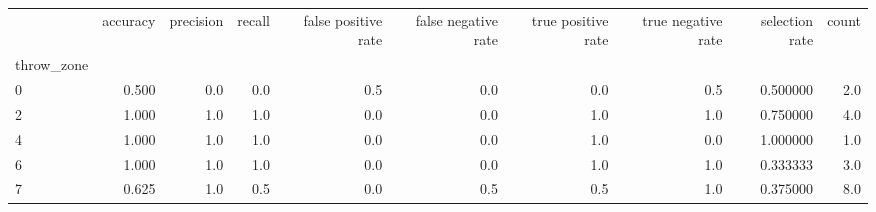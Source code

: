 \begin{tabular}{lrrrrrrrrr}
\toprule
{} &  accuracy &  precision &  recall &  false positive rate &  false negative rate &  true positive rate &  true negative rate &  selection rate &  count \\
throw\_zone &           &            &         &                      &                      &                     &                     &                 &        \\
\midrule
0          &     0.500 &        0.0 &     0.0 &                  0.5 &                  0.0 &                 0.0 &                 0.5 &        0.500000 &    2.0 \\
2          &     1.000 &        1.0 &     1.0 &                  0.0 &                  0.0 &                 1.0 &                 1.0 &        0.750000 &    4.0 \\
4          &     1.000 &        1.0 &     1.0 &                  0.0 &                  0.0 &                 1.0 &                 0.0 &        1.000000 &    1.0 \\
6          &     1.000 &        1.0 &     1.0 &                  0.0 &                  0.0 &                 1.0 &                 1.0 &        0.333333 &    3.0 \\
7          &     0.625 &        1.0 &     0.5 &                  0.0 &                  0.5 &                 0.5 &                 1.0 &        0.375000 &    8.0 \\
\bottomrule
\end{tabular}
